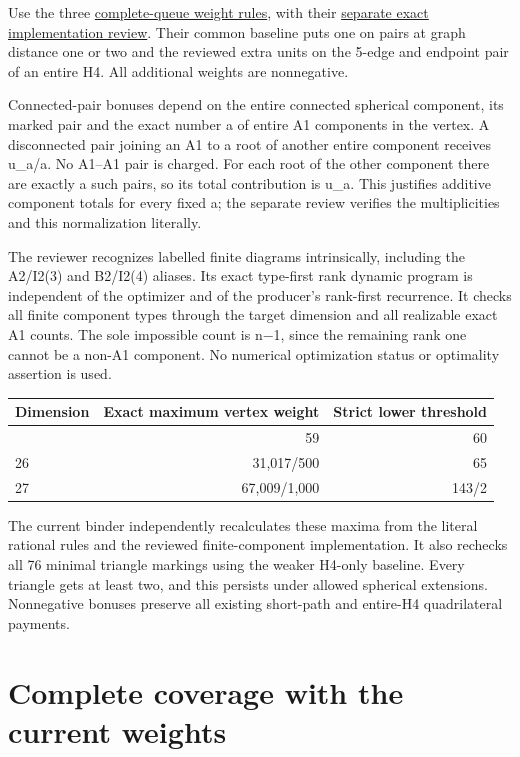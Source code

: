 \documentclass[
  10pt,
]{report}
\newcounter{none} %
\begin{document}
Use the three
\href{fresh_sqrt5_complete_face_weights_20261015.md}{complete-queue
weight rules}, with their
\href{fresh_sqrt5_complete_face_weights_20261015_review.md}{separate
exact implementation review}. Their common baseline puts one on pairs at
graph distance one or two and the reviewed extra units on the 5-edge and
endpoint pair of an entire H4. All additional weights are nonnegative.

Connected-pair bonuses depend on the entire connected spherical
component, its marked pair and the exact number a of entire A1
components in the vertex. A disconnected pair joining an A1 to a root of
another entire component receives u\_a/a. No A1--A1 pair is charged. For
each root of the other component there are exactly a such pairs, so its
total contribution is u\_a. This justifies additive component totals for
every fixed a; the separate review verifies the multiplicities and this
normalization literally.

The reviewer recognizes labelled finite diagrams intrinsically,
including the A2/I2(3) and B2/I2(4) aliases. Its exact type-first rank
dynamic program is independent of the optimizer and of the producer's
rank-first recurrence. It checks all finite component types through the
target dimension and all realizable exact A1 counts. The sole impossible
count is n−1, since the remaining rank one cannot be a non-A1 component.
No numerical optimization status or optimality assertion is used.

{\def\LTcaptype{none} %
\begin{longtable}[]{@{}lrr@{}}
\toprule\noalign{}
Dimension & Exact maximum vertex weight & Strict lower threshold \\
\midrule\noalign{}
\endhead
\bottomrule\noalign{}
\endlastfoot
25 & 59 & 60 \\
26 & 31,017/500 & 65 \\
27 & 67,009/1,000 & 143/2 \\
\end{longtable}
}

The current binder independently recalculates these maxima from the
literal rational rules and the reviewed finite-component implementation.
It also rechecks all 76 minimal triangle markings using the weaker
H4-only baseline. Every triangle gets at least two, and this persists
under allowed spherical extensions. Nonnegative bonuses preserve all
existing short-path and entire-H4 quadrilateral payments.

\section{Complete coverage with the current
weights}\label{complete-coverage-with-the-current-weights}
\end{document}
